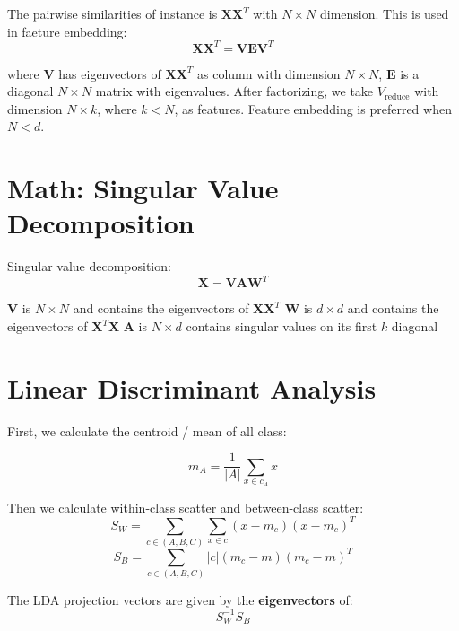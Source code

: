 \begin{multicols*}{2}
\noindent The pairwise similarities of instance is $\mathbf{X} \mathbf{X}^{T}$ with $N\times N$ dimension. This is used in faeture embedding:
$$\mathbf{X} \mathbf{X}^{T} = \mathbf{VEV}^{T}$$

\noindent where $\mathbf{V}$ has eigenvectors of $\mathbf{X} \mathbf{X}^{T}$ as column with dimension $N\times N$, $\mathbf{E}$ is a diagonal $N\times N$ matrix with eigenvalues. After factorizing, we take $V_{\text{reduce}}$ with dimension $N\times k$, where $k<N$, as features. Feature embedding is preferred when $N<d$. 

\section{Math: Singular Value Decomposition}
\noindent Singular value decomposition:
$$\mathbf{X} = \mathbf{VAW}^{T}$$

\noindent $\mathbf{V}$ is $N\times N$ and contains the eigenvectors of $\mathbf{XX}^T$
\noindent $\mathbf{W}$ is $d\times d$ and contains the eigenvectors of $\mathbf{X}^T \mathbf{X}$
\noindent $\mathbf{A}$ is $N\times d$ contains singular values on its first $k$ diagonal

\section{Linear Discriminant Analysis}

\noindent First, we calculate the centroid / mean of all class:

$$m_A = \frac{1}{|A|} \sum_{x \in c_A} x$$

\noindent Then we calculate within-class scatter and between-class scatter:
$$S_W = \sum_{c \in (A,B,C)} \sum_{x \in c} (x-m_c)(x-m_c)^{T}$$
$$S_B = \sum_{c \in (A,B,C)} |c| (m_c - m)(m_c - m)^T$$

\noindent The LDA projection vectors are given by the \textbf{eigenvectors} of:
$$S_W^{-1}S_B$$

\end{multicols*}
